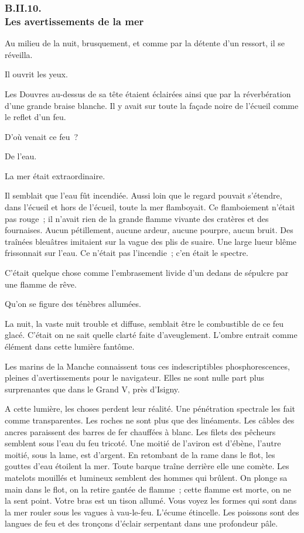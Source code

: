 \documentclass[french,twoside]{book} %
\begin{document}
 \subsubsection[{B.II.10. Les avertissements de la mer}]{B.II.10. \\
Les avertissements de la mer}
\noindent Au milieu de la nuit, brusquement, et comme par la détente d’un ressort, il se réveilla.\par
Il ouvrit les yeux.\par
Les Douvres au-dessus de sa tête étaient éclairées ainsi que par la réverbération d’une grande braise blanche. Il y avait sur toute la façade noire de l’écueil comme le reflet d’un feu.\par
D’où venait ce feu ?\par
De l’eau.\par
La mer était extraordinaire.\par
Il semblait que l’eau fût incendiée. Aussi loin que le regard pouvait s’étendre, dans l’écueil et hors de l’écueil, toute la mer flamboyait. Ce flamboiement n’était pas rouge ; il n’avait rien de la grande flamme vivante des cratères et des fournaises. Aucun pétillement, aucune ardeur, aucune pourpre, aucun bruit. Des traînées bleuâtres imitaient sur la vague des plis de suaire. Une large lueur blême frissonnait sur l’eau. Ce n’était pas l’incendie ; c’en était le spectre.\par
 C’était quelque chose comme l’embrasement livide d’un dedans de sépulcre par une flamme de rêve.\par
Qu’on se figure des ténèbres allumées.\par
La nuit, la vaste nuit trouble et diffuse, semblait être le combustible de ce feu glacé. C’était on ne sait quelle clarté faite d’aveuglement. L’ombre entrait comme élément dans cette lumière fantôme.\par
Les marins de la Manche connaissent tous ces indescriptibles phosphorescences, pleines d’avertissements pour le navigateur. Elles ne sont nulle part plus surprenantes que dans le Grand V, près d’Isigny.\par
A cette lumière, les choses perdent leur réalité. Une pénétration spectrale les fait comme transparentes. Les roches ne sont plus que des linéaments. Les câbles des ancres paraissent des barres de fer chauffées à blanc. Les filets des pêcheurs semblent sous l’eau du feu tricoté. Une moitié de l’aviron est d’ébène, l’autre moitié, sous la lame, est d’argent. En retombant de la rame dans le flot, les gouttes d’eau étoilent la mer. Toute barque traîne derrière elle une comète. Les matelots mouillés et lumineux semblent des hommes qui brûlent. On plonge sa main dans le flot, on la retire gantée de flamme ; cette flamme est morte, on ne la sent point. Votre bras est un tison allumé. Vous voyez les formes qui sont dans la mer rouler sous les vagues à vau-le-feu. L’écume étincelle. Les poissons sont des langues de feu et des tronçons d’éclair serpentant dans une profondeur pâle.\par
\end{document}

